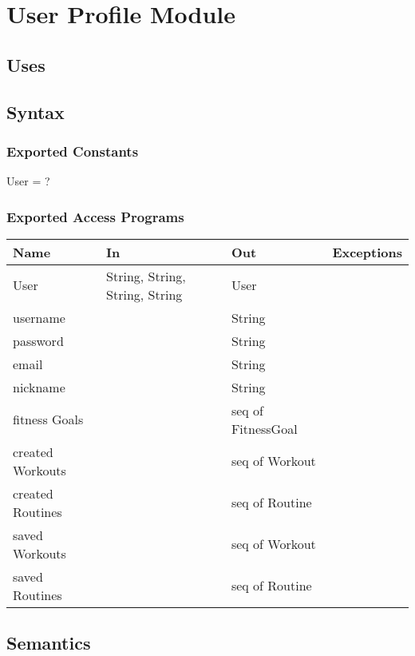 \documentclass[12pt, titlepage]{article}
\begin{document}
\section{User Profile Module}

\subsection{Uses}

\subsection{Syntax}

\subsubsection{Exported Constants}
User = ?
\subsubsection{Exported Access Programs}

\begin{center}
	\begin{tabular}{p{4cm} p{4cm} p{3cm} p{2cm}}
		\hline
		\textbf{Name} & \textbf{In} & \textbf{Out} & \textbf{Exceptions} \\
		\hline
		User & String, String, String, String & User &  \\
		username &  & String &  \\
 		password &  & String &  \\
 		email &  & String &  \\
 		nickname &  & String &  \\
 		fitness Goals &  & seq of FitnessGoal &  \\
 		created Workouts &  & seq of Workout &  \\
 		created Routines &  & seq of Routine &  \\
 		saved Workouts &  & seq of Workout &  \\
 		saved Routines &  & seq of Routine &  \\
		\hline
	\end{tabular}
\end{center}

\subsection{Semantics}
\end{document}
